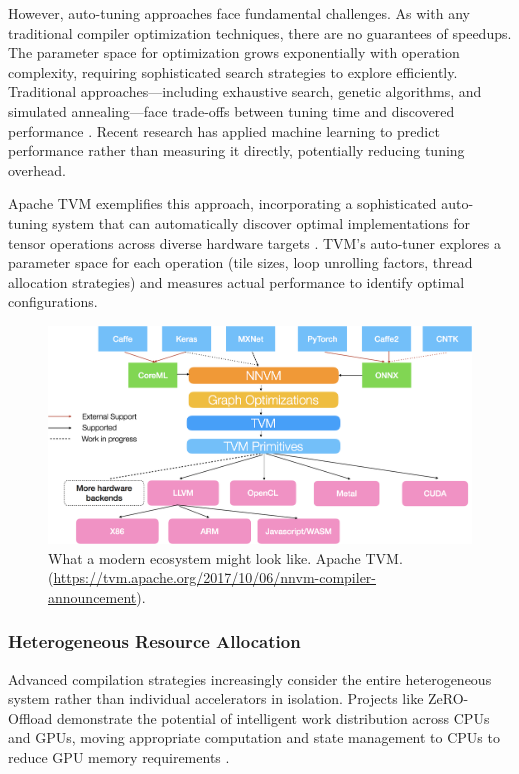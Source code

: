 \documentclass[manuscript,screen,review,format=acmsmall]{acmart}
\begin{document}
However, auto-tuning approaches face fundamental challenges. As with any traditional compiler optimization techniques, there are no guarantees of speedups. The parameter space for optimization grows exponentially with operation complexity, requiring sophisticated search strategies to explore efficiently. Traditional approaches—including exhaustive search, genetic algorithms, and simulated annealing—face trade-offs between tuning time and discovered performance \cite{AshouriAmirH2018ASoC}. Recent research has applied machine learning to predict performance rather than measuring it directly, potentially reducing tuning overhead.

Apache TVM exemplifies this approach, incorporating a sophisticated auto-tuning system that can automatically discover optimal implementations for tensor operations across diverse hardware targets \cite{ChenTianqi2018TAAE}. TVM's auto-tuner explores a parameter space for each operation (tile sizes, loop unrolling factors, thread allocation strategies) and measures actual performance to identify optimal configurations.

\begin{figure}[h]
  \centering
  \includegraphics[width=\linewidth]{figures/nnvm_compiler_stack.png}
  \caption{What a modern ecosystem might look like.
    Apache TVM. (\url{https://tvm.apache.org/2017/10/06/nnvm-compiler-announcement}).}
\end{figure}

\subsubsection{Heterogeneous Resource Allocation}

Advanced compilation strategies increasingly consider the entire heterogeneous system rather than individual accelerators in isolation. Projects like ZeRO-Offload demonstrate the potential of intelligent work distribution across CPUs and GPUs, moving appropriate computation and state management to CPUs to reduce GPU memory requirements \cite{RenJie2021ZDBM}.
\end{document}
